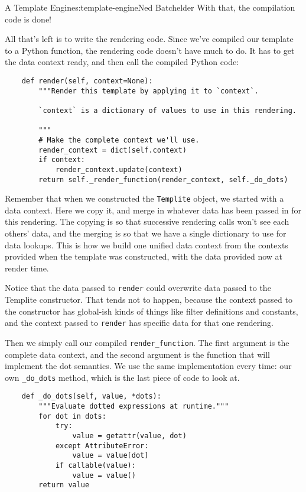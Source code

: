 \begin{aosachapter}{A Template Engine}{s:template-engine}{Ned Batchelder}
With that, the compilation code is done!

\label{rendering}

All that's left is to write the rendering code. Since we've compiled our
template to a Python function, the rendering code doesn't have much to
do. It has to get the data context ready, and then call the compiled
Python code:

\begin{verbatim}
    def render(self, context=None):
        """Render this template by applying it to `context`.

        `context` is a dictionary of values to use in this rendering.

        """
        # Make the complete context we'll use.
        render_context = dict(self.context)
        if context:
            render_context.update(context)
        return self._render_function(render_context, self._do_dots)
\end{verbatim}

Remember that when we constructed the \texttt{Templite} object, we
started with a data context. Here we copy it, and merge in whatever data
has been passed in for this rendering. The copying is so that successive
rendering calls won't see each others' data, and the merging is so that
we have a single dictionary to use for data lookups. This is how we
build one unified data context from the contexts provided when the
template was constructed, with the data provided now at render time.

Notice that the data passed to \texttt{render} could overwrite data
passed to the Templite constructor. That tends not to happen, because
the context passed to the constructor has global-ish kinds of things
like filter definitions and constants, and the context passed to
\texttt{render} has specific data for that one rendering.

Then we simply call our compiled \texttt{render\_function}. The first
argument is the complete data context, and the second argument is the
function that will implement the dot semantics. We use the same
implementation every time: our own \texttt{\_do\_dots} method, which is
the last piece of code to look at.

\begin{verbatim}
    def _do_dots(self, value, *dots):
        """Evaluate dotted expressions at runtime."""
        for dot in dots:
            try:
                value = getattr(value, dot)
            except AttributeError:
                value = value[dot]
            if callable(value):
                value = value()
        return value
\end{verbatim}


\end{aosachapter}
